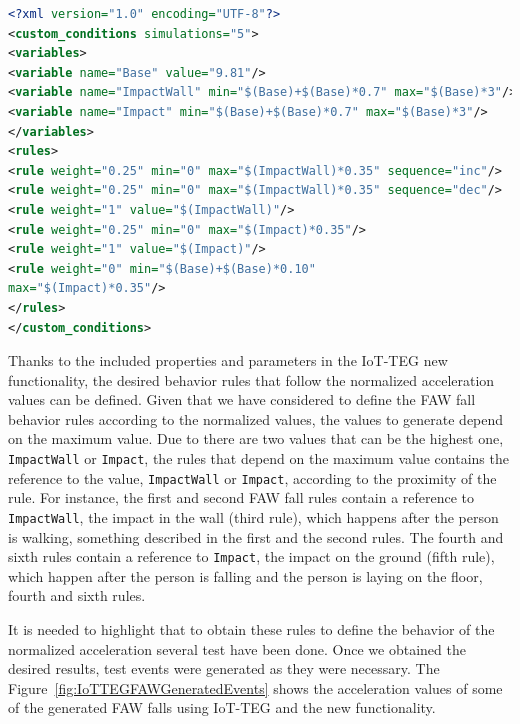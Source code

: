 \documentclass[10pt,journal,compsoc]{IEEEtran}
\begin{document}
\begin{lstlisting}[basicstyle=\ttfamily\footnotesize,language=XML,caption={Rules to define a FAW fall},label=FAWFallRules, breaklines=true]
<?xml version="1.0" encoding="UTF-8"?>
<custom_conditions simulations="5">
<variables>
<variable name="Base" value="9.81"/>
<variable name="ImpactWall" min="$(Base)+$(Base)*0.7" max="$(Base)*3"/>
<variable name="Impact" min="$(Base)+$(Base)*0.7" max="$(Base)*3"/>
</variables>
<rules>
<rule weight="0.25" min="0" max="$(ImpactWall)*0.35" sequence="inc"/>
<rule weight="0.25" min="0" max="$(ImpactWall)*0.35" sequence="dec"/>
<rule weight="1" value="$(ImpactWall)"/>
<rule weight="0.25" min="0" max="$(Impact)*0.35"/>
<rule weight="1" value="$(Impact)"/>
<rule weight="0" min="$(Base)+$(Base)*0.10"
max="$(Impact)*0.35"/>
</rules>
</custom_conditions>
\end{lstlisting}

Thanks to the included properties and parameters in the IoT-TEG new functionality, the desired behavior rules that
follow the normalized acceleration values can be defined. Given that we have considered to define the FAW fall behavior
rules according to the normalized values, the values to generate depend on the maximum value. Due to there are two 
values that can be the highest one, \texttt{ImpactWall} or \texttt{Impact}, the rules that depend on the maximum 
value contains the reference to the value, \texttt{ImpactWall} or \texttt{Impact}, according to the proximity
of the rule. For instance, the first and second FAW fall rules contain a reference to \texttt{ImpactWall}, the impact 
in the wall (third rule), which happens after the person is walking, something described in the first and the second rules.
The fourth and sixth rules contain a reference to \texttt{Impact}, the impact on the ground (fifth rule), which happen
after the person is falling and the person is laying on the floor, fourth and sixth rules.

It is needed to highlight that to obtain these rules to define the behavior of the normalized acceleration several test have been done. Once we obtained the desired results, test events were generated as they were necessary. The Figure~\ref{fig:IoTTEGFAWGeneratedEvents} shows the acceleration values of some of the generated FAW falls using IoT-TEG and the new functionality.
\end{document}
